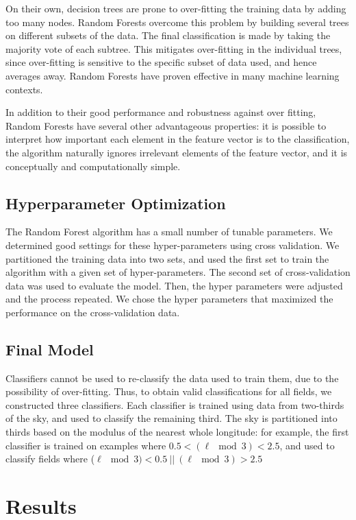 \documentclass[preprint]{aastex}
\begin{document}
On their own, decision trees are prone to over-fitting the training data by adding too many nodes. Random Forests overcome this problem by building several trees on different subsets of the data. The final classification is made by taking the majority vote of each subtree. This mitigates over-fitting in the individual trees, since over-fitting is sensitive to the specific subset of data used, and hence averages away. Random Forests have proven effective in many machine learning contexts.

In addition to their good performance and robustness against over fitting, Random Forests have several other advantageous properties: it is possible to interpret how important each element in the feature vector is to the classification, the algorithm naturally ignores irrelevant elements of the feature vector, and it is conceptually and computationally simple.

\subsection{Hyperparameter Optimization}
The Random Forest algorithm has a small number of tunable parameters. We determined good settings for these hyper-parameters using cross validation. We partitioned the training data into two sets, and used the first set to train the algorithm with a given set of hyper-parameters. The second set of cross-validation data was used to evaluate the model. Then, the hyper parameters were adjusted and the process repeated. We chose the hyper parameters that maximized the performance on the cross-validation data.

\subsection{Final Model}

Classifiers cannot be used to re-classify the data used to train them, due to the possibility of over-fitting. Thus, to obtain valid classifications for all fields, we constructed three classifiers. Each classifier is trained using data from two-thirds of the sky, and used to classify the remaining third. The sky is partitioned into thirds based on the modulus of the nearest whole longitude: for example, the first classifier is trained on examples where $0.5 < (\ell \mod{3})  < 2.5$, and used to classify fields where ($\ell \mod{3}) < 0.5 ~ || ~(\ell \mod{3}) > 2.5 $

\section{Results}
\label{sec:results}
\end{document}
